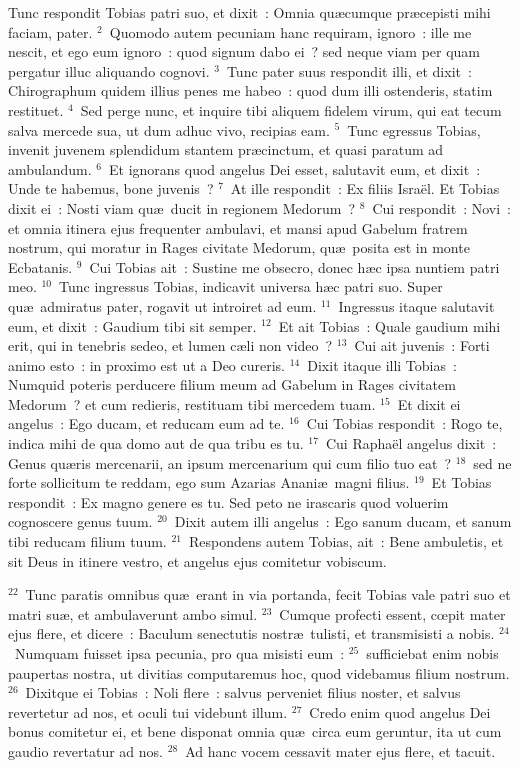 \lettrine[lines=10,image=true,loversize=0.05,lraise=-0.03]{T}{}unc respondit Tobias patri suo, et dixit~: Omnia qu\ae cumque pr\ae cepisti mihi faciam, pater.
${}^{2}$~Quomodo autem pecuniam hanc requiram, ignoro~: ille me nescit, et ego eum ignoro~: quod signum dabo ei~? sed neque viam per quam pergatur illuc aliquando cognovi.
${}^{3}$~Tunc pater suus respondit illi, et dixit~: Chirographum quidem illius penes me habeo~: quod dum illi ostenderis, statim restituet.
${}^{4}$~Sed perge nunc, et inquire tibi aliquem fidelem virum, qui eat tecum salva mercede sua, ut dum adhuc vivo, recipias eam.
${}^{5}$~Tunc egressus Tobias, invenit juvenem splendidum stantem pr\ae cinctum, et quasi paratum ad ambulandum.
${}^{6}$~Et ignorans quod angelus Dei esset, salutavit eum, et dixit~: Unde te habemus, bone juvenis~?
${}^{7}$~At ille respondit~: Ex filiis Isra\"el. Et Tobias dixit ei~: Nosti viam qu\ae\ ducit in regionem Medorum~?
${}^{8}$~Cui respondit~: Novi~: et omnia itinera ejus frequenter ambulavi, et mansi apud Gabelum fratrem nostrum, qui moratur in Rages civitate Medorum, qu\ae\ posita est in monte Ecbatanis.
${}^{9}$~Cui Tobias ait~: Sustine me obsecro, donec h\ae c ipsa nuntiem patri meo.
${}^{10}$~Tunc ingressus Tobias, indicavit universa h\ae c patri suo. Super qu\ae\ admiratus pater, rogavit ut introiret ad eum.
${}^{11}$~Ingressus itaque salutavit eum, et dixit~: Gaudium tibi sit semper.
${}^{12}$~Et ait Tobias~: Quale gaudium mihi erit, qui in tenebris sedeo, et lumen c\ae li non video~?
${}^{13}$~Cui ait juvenis~: Forti animo esto~: in proximo est ut a Deo cureris.
${}^{14}$~Dixit itaque illi Tobias~: Numquid poteris perducere filium meum ad Gabelum in Rages civitatem Medorum~? et cum redieris, restituam tibi mercedem tuam.
${}^{15}$~Et dixit ei angelus~: Ego ducam, et reducam eum ad te.
${}^{16}$~Cui Tobias respondit~: Rogo te, indica mihi de qua domo aut de qua tribu es tu.
${}^{17}$~Cui Rapha\"el angelus dixit~: Genus qu\ae ris mercenarii, an ipsum mercenarium qui cum filio tuo eat~?
${}^{18}$~sed ne forte sollicitum te reddam, ego sum Azarias Anani\ae\ magni filius.
${}^{19}$~Et Tobias respondit~: Ex magno genere es tu. Sed peto ne irascaris quod voluerim cognoscere genus tuum.
${}^{20}$~Dixit autem illi angelus~: Ego sanum ducam, et sanum tibi reducam filium tuum.
${}^{21}$~Respondens autem Tobias, ait~: Bene ambuletis, et sit Deus in itinere vestro, et angelus ejus comitetur vobiscum.


${}^{22}$~Tunc paratis omnibus qu\ae\ erant in via portanda, fecit Tobias vale patri suo et matri su\ae , et ambulaverunt ambo simul.
${}^{23}$~Cumque profecti essent, cœpit mater ejus flere, et dicere~: Baculum senectutis nostr\ae\ tulisti, et transmisisti a nobis.
${}^{24}$~Numquam fuisset ipsa pecunia, pro qua misisti eum~:
${}^{25}$~sufficiebat enim nobis paupertas nostra, ut divitias computaremus hoc, quod videbamus filium nostrum.
${}^{26}$~Dixitque ei Tobias~: Noli flere~: salvus perveniet filius noster, et salvus revertetur ad nos, et oculi tui videbunt illum.
${}^{27}$~Credo enim quod angelus Dei bonus comitetur ei, et bene disponat omnia qu\ae\ circa eum geruntur, ita ut cum gaudio revertatur ad nos.
${}^{28}$~Ad hanc vocem cessavit mater ejus flere, et tacuit.

